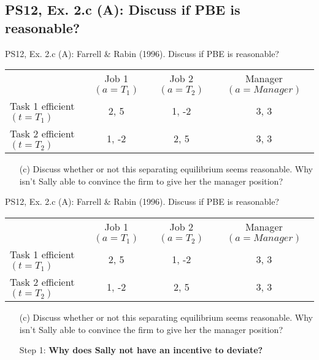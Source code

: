 \subsection{PS12, Ex. 2.c (A): Discuss if PBE is reasonable?}

\begin{frame}{PS12, Ex. 2.c (A): Farrell \& Rabin (1996). Discuss if PBE is reasonable?}
    \begin{table}
      \begin{tabular}{l|c|c|c|}
          \multicolumn{1}{c}{} & \multicolumn{1}{c}{Job 1 $(a=T_1)$} & \multicolumn{1}{c}{Job 2 $(a=T_2)$} & \multicolumn{1}{c}{Manager $(a=Manager)$} \\\cline{2-4}
           Task 1 efficient $(t=T_1)$ & 2, 5 & 1, -2 & 3, 3 \\\cline{2-4}
           Task 2 efficient $(t=T_2)$ & 1, -2 & 2, 5 & 3, 3 \\\cline{2-4}
      \end{tabular}
    \end{table}\vspace{-12pt}
    \begin{itemize}
      \item[(c)] Discuss whether or not this separating equilibrium seems reasonable. Why isn’t Sally able to convince the firm to give her the manager position?
    \end{itemize}\vspace{-6pt}
    \begin{multicols}{2}
      \vfill\null\columnbreak
      \vfill\null
    \end{multicols}
\end{frame}
\begin{frame}{PS12, Ex. 2.c (A): Farrell \& Rabin (1996). Discuss if PBE is reasonable?}
    \begin{table}
      \begin{tabular}{l|c|c|c|}
          \multicolumn{1}{c}{} & \multicolumn{1}{c}{Job 1 $(a=T_1)$} & \multicolumn{1}{c}{Job 2 $(a=T_2)$} & \multicolumn{1}{c}{Manager $(a=Manager)$} \\\cline{2-4}
           Task 1 efficient $(t=T_1)$ & 2, 5 & 1, -2 & 3, 3 \\\cline{2-4}
           Task 2 efficient $(t=T_2)$ & 1, -2 & 2, 5 & 3, 3 \\\cline{2-4}
      \end{tabular}
    \end{table}\vspace{-12pt}
    \begin{itemize}
      \item[(c)] Discuss whether or not this separating equilibrium seems reasonable. Why isn’t Sally able to convince the firm to give her the manager position?
      \item[Step 1:] \textbf{Why does Sally not have an incentive to deviate?}
    \end{itemize}
    \vfill\null
\end{frame}

